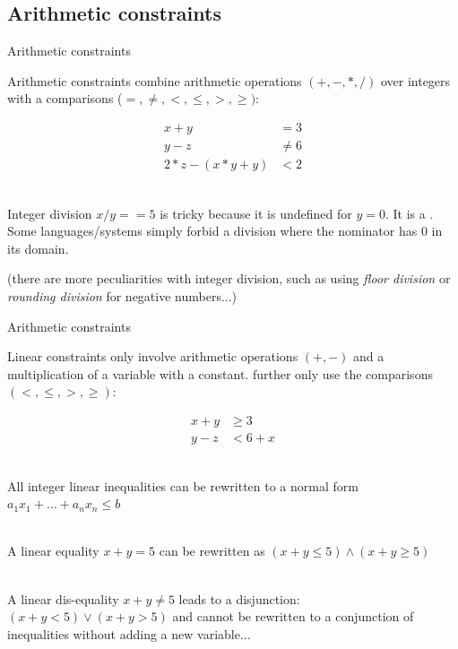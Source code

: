\documentclass{cons-beamer}
\begin{document}
\subsection{Arithmetic constraints}

\begin{frame}{Arithmetic constraints}

  Arithmetic constraints combine arithmetic operations $(+,-,*,/)$ over integers with a comparisons ($=, \neq, <, \leq, >, \geq)$:

  \begin{align}
    x + y &= 3 \\
    y - z &\neq 6 \\
    2*z - (x*y + y) & < 2
  \end{align}

  $ $\\
  Integer division $x/y == 5$ is tricky because it is undefined for $y=0$. It is a . Some languages/systems simply forbid a division where the nominator has $0$ in its domain.

  (there are more peculiarities with integer division, such as using \textit{floor division} or \textit{rounding division} for negative numbers...)
\end{frame}

\begin{frame}{Arithmetic constraints}

  Linear constraints only involve arithmetic operations $(+, -)$ and a multiplication of a variable with a constant.  further only use the comparisons $(<, \leq, >, \geq)$:

  \begin{align}
    x + y &\geq 3 \\
    y - z &< 6 + x
  \end{align}

  $ $\\
  All integer linear inequalities can be rewritten to a normal form $a_1x_1 + \ldots + a_n x_n \leq b$

  $ $\\
  A linear equality $x + y = 5$ can be rewritten as $(x + y \leq 5) \wedge (x + y \geq 5)$

  $ $\\
  A linear dis-equality $x + y \neq 5$ leads to a disjunction: $(x + y < 5) \vee (x + y > 5)$ and cannot be rewritten to a conjunction of inequalities without adding a new variable...

\end{frame}
\end{document}
